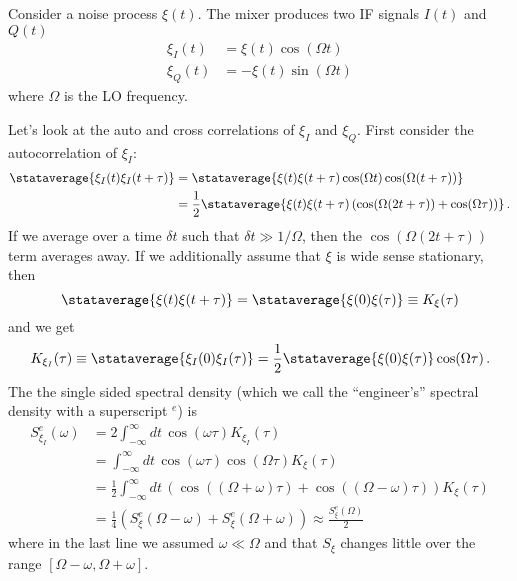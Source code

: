 
Consider a noise process $\xi(t)$.
The mixer produces two IF signals $I(t)$ and $Q(t)$
\begin{align}
\xi_I(t) &= \xi(t) \cos(\Omega t) \\
\xi_Q(t) &= -\xi(t) \sin(\Omega t)
\end{align}
where $\Omega$ is the LO frequency.


Let's look at the auto and cross correlations of $\xi_I$ and $\xi_Q$.
First consider the autocorrelation of $\xi_I$:
\begin{align}
\stataverage{\xi_I(t) \xi_I(t+\tau)}
&= \stataverage{ \xi(t) \xi(t+\tau) \cos(\Omega t) \cos(\Omega (t + \tau))} \\
&= \frac{1}{2} \stataverage{ \xi(t) \xi(t+\tau) \left( \cos(\Omega (2t + \tau)) + \cos(\Omega \tau) \right) } \, .
\end{align}
If we average over a time $\delta t$ such that $\delta t \gg 1/\Omega$, then the $\cos(\Omega (2t + \tau))$ term averages away.
If we additionally assume that $\xi$ is wide sense stationary, then
\begin{equation}
\stataverage{\xi(t) \xi(t+\tau)} = \stataverage{\xi(0)\xi(\tau)} \equiv K_{\xi}(\tau)
\end{equation}
and we get
\begin{equation}
K_{\xi_I}(\tau) \equiv \stataverage{\xi_I(0) \xi_I(\tau)} = \frac{1}{2} \stataverage{\xi(0)\xi(\tau)} \cos(\Omega \tau) \, .
\end{equation}
The the single sided spectral density (which we call the ``engineer's'' spectral density with a superscript $^e$) is
\begin{align}
S_{\xi_I}^e(\omega)
&= 2 \int_{-\infty}^\infty dt \, \cos(\omega \tau) K_{\xi_I}(\tau) \\
&= \int_{-\infty}^\infty dt \, \cos(\omega \tau) \cos(\Omega \tau) K_{\xi}(\tau) \\
&= \frac{1}{2} \int_{-\infty}^\infty dt \, \left( \cos((\Omega + \omega) \tau) + \cos((\Omega - \omega) \tau) \right) K_{\xi}(\tau) \\
&= \frac{1}{4} \left( S_{\xi}^e(\Omega - \omega) + S_{\xi}^e(\Omega + \omega) \right) \approx \frac{S_{\xi}^e(\Omega)}{2}
\end{align}
where in the last line we assumed $\omega \ll \Omega$ and that $S_{\xi}$ changes little over the range $\left[ \Omega - \omega , \Omega + \omega \right]$.

